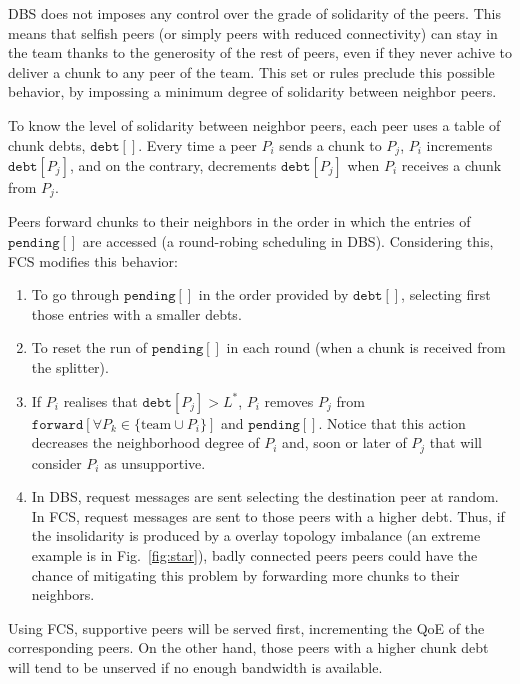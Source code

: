 

DBS does not imposes any control over the grade of solidarity of the
peers. This means that selfish peers (or simply peers with reduced
connectivity) can stay in the team thanks to the generosity of the
rest of peers, even if they never achive to deliver a chunk to any
peer of the team. This set or rules preclude this possible behavior,
by impossing a minimum degree of solidarity between neighbor peers.

To know the level of solidarity between neighbor peers, each peer uses
a table of chunk debts, $\mathtt{debt}[]$. Every time a peer $P_i$
sends a chunk to $P_j$, $P_i$ increments $\mathtt{debt}[P_j]$, and on
the contrary, decrements $\mathtt{debt}[P_j]$ when $P_i$ receives a
chunk from $P_j$.

Peers forward chunks to their neighbors in the order in which the
entries of $\mathtt{pending}[]$ are accessed (a round-robing
scheduling in DBS). Considering this, FCS modifies this behavior:
\begin{enumerate}
\item To go through $\mathtt{pending}[]$ in the order provided by
  $\mathtt{debt}[]$, selecting first those entries with a smaller
  debts.
\item To reset the run of $\mathtt{pending}[]$ in each round (when a
  chunk is received from the splitter).
\item If $P_i$ realises that $\mathtt{debt}[P_j]>L^*$, $P_i$ removes
  $P_j$ from $\mathtt{forward}[\forall P_k\in\{\text{team}\cup P_i\}]$
  and $\mathtt{pending}[]$. Notice that this action decreases the
  neighborhood degree of $P_i$ and, soon or later of $P_j$ that will
  consider $P_i$ as unsupportive.
\item In DBS, request messages are sent selecting the destination peer
  at random. In FCS, request messages are sent to those peers with a
  higher debt. Thus, if the insolidarity is produced by a overlay
  topology imbalance (an extreme example is in Fig.~\ref{fig:star}),
  badly connected peers peers could have the chance of mitigating this
  problem by forwarding more chunks to their neighbors.
\end{enumerate}

Using FCS, supportive peers will be served first, incrementing the
QoE of the corresponding peers. On the other hand, those peers with a
higher chunk debt will tend to be unserved if no enough bandwidth is
available. 


